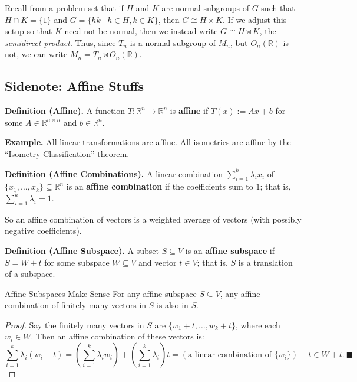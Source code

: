 \begin{remark}
Recall from a problem set that if $H$ and $K$ are normal subgroups of $G$ such that $H \cap K = \{1\}$ and $G = \{hk \mid h \in H, k \in K\}$, then $G \cong H \times K$.  If we adjust this setup so that $K$ need not be normal, then we instead write $G \cong H \rtimes K$, the \emph{semidirect product}.  Thus, since $T_n$ is a normal subgroup of $M_n$, but $O_n(\mathbb{R})$ is not, we can write $M_n = T_n \rtimes O_n(\mathbb{R})$.
\end{remark}

\subsection{Sidenote: Affine Stuffs}

\textbf{Definition (Affine).} A function $T: \mathbb{R}^n \to \mathbb{R}^n$ is \textbf{affine} if $T(x) := Ax + b$ for some $A \in \mathbb{R}^{n \times n}$ and $b \in \mathbb{R}^n$.

\textbf{Example.} All linear transformations are affine.  All isometries are affine by the ``Isometry Classification'' theorem.

\textbf{Definition (Affine Combinations).} A linear combination $\sum_{i = 1}^k \lambda_i x_i$ of $\{x_1, \dots, x_k \} \subseteq \mathbb{R}^n$ is an \textbf{affine combination} if the coefficients sum to $1$; that is, $\sum_{i = 1}^k \lambda_i = 1$.

So an affine combination of vectors is a weighted average of vectors (with possibly negative coefficients).

\textbf{Definition (Affine Subspace).} A subset $S \subseteq V$ is an \textbf{affine subspace} if $S = W + t$ for some subspace $W \subseteq V$ and vector $t \in V$; that is, $S$ is a translation of a subspace.

\begin{theorem}{Affine Subspaces Make Sense}
    For any affine subspace $S \subseteq V$, any affine combination of finitely many vectors in $S$ is also in $S$.
\end{theorem}

\begin{proof}
    Say the finitely many vectors in $S$ are $\{w_1 + t, \dots, w_k + t\}$, where each $w_i \in W$.  Then an affine combination of these vectors is:
    \[ \sum_{i = 1}^k \lambda_i(w_i + t) = \left(\sum_{i = 1}^k \lambda_i w_i\right) + \left(\sum_{i = 1}^k \lambda_i\right)t = (\text{a linear combination of $\{w_i\}$}) + t \in W + t. ~ \blacksquare\] \vspace{-0.6cm}
\end{proof}

